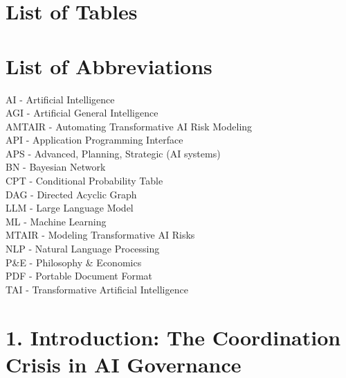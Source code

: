 \documentclass[
  11pt,
  letterpaper,
]{book}
\begin{document}

\chapter*{List of Tables}\label{list-of-tables}



\chapter*{List of Abbreviations}\label{list-of-abbreviations-1}


AI - Artificial Intelligence\\
AGI - Artificial General Intelligence\\
AMTAIR - Automating Transformative AI Risk Modeling\\
API - Application Programming Interface\\
APS - Advanced, Planning, Strategic (AI systems)\\
BN - Bayesian Network\\
CPT - Conditional Probability Table\\
DAG - Directed Acyclic Graph\\
LLM - Large Language Model\\
ML - Machine Learning\\
MTAIR - Modeling Transformative AI Risks\\
NLP - Natural Language Processing\\
P\&E - Philosophy \& Economics\\
PDF - Portable Document Format\\
TAI - Transformative Artificial Intelligence


\chapter*{1. Introduction: The Coordination Crisis in AI
Governance}\label{sec-introduction}

\end{document}
